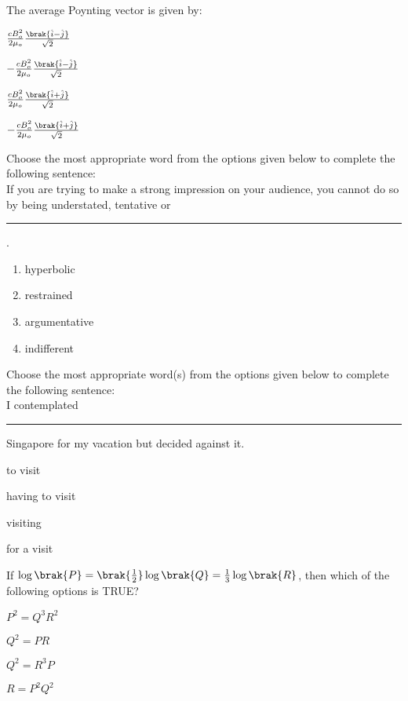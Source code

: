 \item  The average Poynting vector is given by:
\begin{enumerate}
\begin{multicols}{2}
\item $\frac{cB_o^2}{2\mu_o}\frac{\brak{\hat{i}-\hat{j}}}{\sqrt{2}}$
\item $-\frac{cB_o^2}{2\mu_o}\frac{\brak{\hat{i}-\hat{j}}}{\sqrt{2}}$
\item $\frac{cB_o^2}{2\mu_o}\frac{\brak{\hat{i}+\hat{j}}}{\sqrt{2}}$
\item $-\frac{cB_o^2}{2\mu_o}\frac{\brak{\hat{i}+\hat{j}}}{\sqrt{2}}$
\end{multicols}
\end{enumerate}
\item Choose the most appropriate word from the options given below to complete the following sentence:\\
If you are trying to make a strong impression on your audience, you cannot do so by being understated, tentative or \rule{3cm}{0.15mm}.
\begin{enumerate}
\item hyperbolic
\item restrained
\item argumentative
\item indifferent
\end{enumerate}
\item Choose the most appropriate word(s) from the options given below to complete the following sentence:\\
I contemplated \rule{3cm}{0.15mm} Singapore for my vacation but decided against it.
\begin{enumerate}
\begin{multicols}{2}
\item to visit
\item having to visit
\item visiting
\item for a visit
\end{multicols}
\end{enumerate}
\item If $\log\brak{P} = \brak{\frac{1}{2}}\log\brak{Q} = \frac{1}{3}\log\brak{R}$, then which of the following options is TRUE?
\begin{enumerate}
\begin{multicols}{4}
\item $P^2 = Q^3R^2$
\item $Q^2 = PR$
\item $Q^2 = R^3P$
\item $R = P^2Q^2$
\end{multicols}
\end{enumerate}
